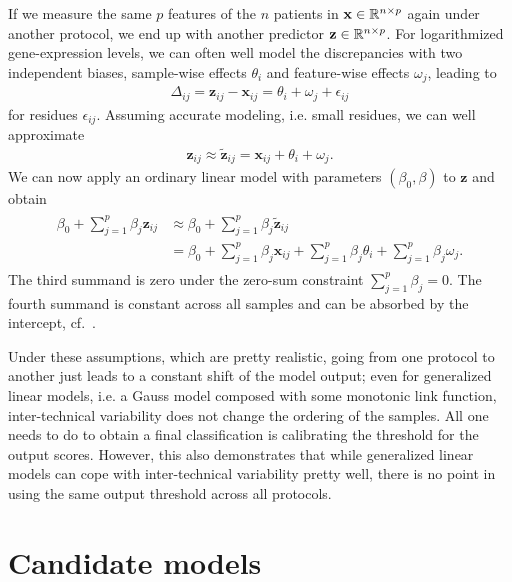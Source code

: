 If we 
measure the same $p$ features of the $n$ patients in $\mathbf{x} \in \mathbb{R}^{n \times p}$ again under 
another protocol, we end up with another predictor 
$\mathbf{z} \in \mathbb{R}^{n \times p}$.
For logarithmized gene-expression levels,
we can often well model the discrepancies with two independent biases, sample-wise effects $\theta_i$
and feature-wise effects $\omega_j$, leading to
\begin{align}\label{eq:inter-tech-exact}
    \Delta_{ij} = \mathbf{z}_{ij} - \mathbf{x}_{ij} = \theta_i + \omega_j + \epsilon_{ij}
\end{align}
for residues $\epsilon_{ij}$. Assuming accurate modeling, i.e. small residues, we can well approximate
\begin{align}
    \mathbf{z}_{ij} \approx \tilde{\mathbf{z}}_{ij} = \mathbf{x}_{ij} + \theta_i + \omega_j.
\end{align}
We can now apply an ordinary linear model with parameters $(\beta_0, \beta)$ to $\mathbf{z}$ 
and obtain
\begin{align} \label{eq:inter-tech}
\begin{split}
    \beta_0 + \sum_{j=1}^p \beta_j \mathbf{z}_{ij} &\approx \beta_0 + \sum_{j=1}^p \beta_j \tilde{\mathbf{z}}_{ij} \\
    &= \beta_0 + \sum_{j=1}^p \beta_j \mathbf{x}_{ij} + \sum_{j=1}^p \beta_j \theta_i + \sum_{j=1}^p \beta_j \omega_j.
\end{split}
\end{align}
The third summand is zero under the zero-sum constraint $\sum_{j = 1}^p \beta_j = 0$. The fourth 
summand is constant across all samples and can be absorbed by the intercept, cf.\ 
\cite{transplatform17}. 

Under these assumptions, which are pretty realistic,
going from one protocol to another just leads to a constant shift of the model 
output; even for generalized linear models, i.e. a Gauss model composed with some monotonic link function,
inter-technical variability does not change the ordering of the samples. All one needs to do to 
obtain a final classification is calibrating the threshold for the output scores. However, this 
also demonstrates that while generalized linear models can cope with inter-technical variability 
pretty well, there is no point in using the same output threshold across all protocols.

\section{Candidate models}\label{sec:candidate-models}

